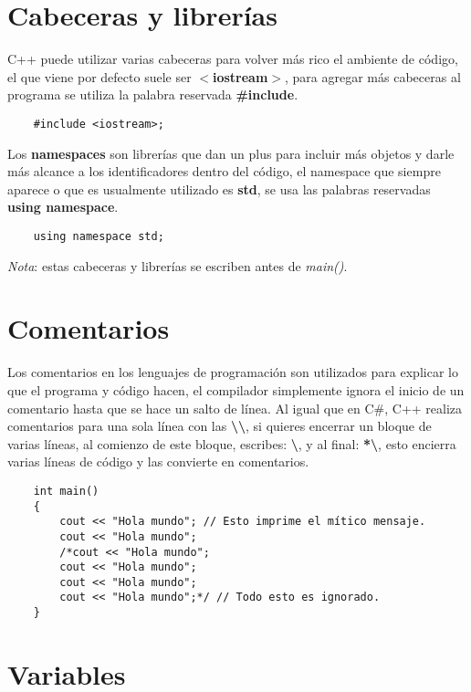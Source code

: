 \section{Cabeceras y librerías}

C++ puede utilizar varias cabeceras para volver más rico el ambiente de código, el que viene por defecto suele ser \textbf{$<$iostream$>$}, para agregar más cabeceras al programa se utiliza la palabra reservada \textbf{\#include}.
\begin{lstlisting}
    #include <iostream>;
\end{lstlisting}

Los \textbf{namespaces} son librerías que dan un plus para incluir más objetos y darle más alcance a los identificadores dentro del código, el namespace que siempre aparece o que es usualmente utilizado es \textbf{std}, se usa las palabras reservadas \textbf{using namespace}.
\begin{lstlisting}
    using namespace std;
\end{lstlisting}

\textit{Nota}: estas cabeceras y librerías se escriben antes de \textit{main()}.



\section{Comentarios}

Los comentarios en los lenguajes de programación son utilizados para explicar lo que el programa y código hacen, el compilador simplemente ignora el inicio de un comentario hasta que se hace un salto de línea. Al igual que en C\#, C++ realiza comentarios para una sola línea con las \textbf{\textbackslash\textbackslash}, si quieres encerrar un bloque de varias líneas, al comienzo de este bloque, escribes: \textbf{\textbackslash*}, y al final: \textbf{*\textbackslash}, esto encierra varias líneas de código y las convierte en comentarios.
\begin{lstlisting}
    int main()
    {
        cout << "Hola mundo"; // Esto imprime el mítico mensaje.
        cout << "Hola mundo";
        /*cout << "Hola mundo";
        cout << "Hola mundo";
        cout << "Hola mundo";
        cout << "Hola mundo";*/ // Todo esto es ignorado.
    }
\end{lstlisting}



\section{Variables}

